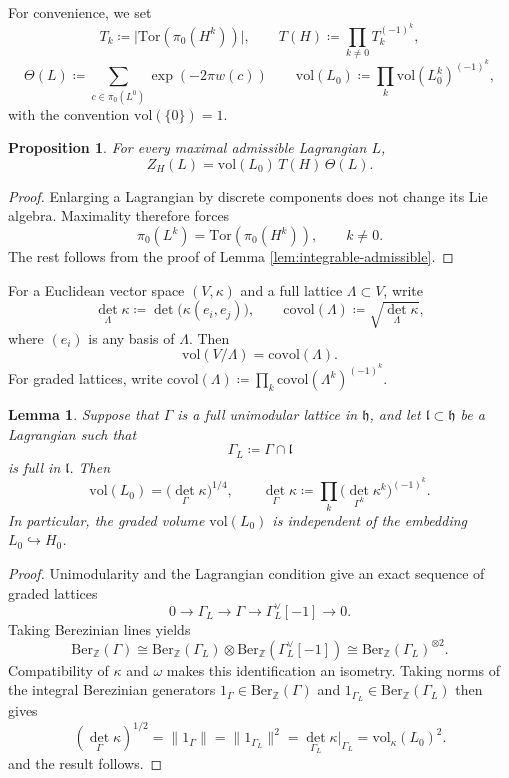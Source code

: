 \documentclass[12pt]{amsart}
\numberwithin{table}{section}
\numberwithin{equation}{section}
\newtheorem{lem}{Lemma}[section]
\newtheorem{prop}{Proposition}[section]
\theoremstyle{plain}
\newcommand{\fh}{\mathfrak{h}}
\newcommand{\fl}{\mathfrak{l}}
\newcommand{\Z}{\mathbb{Z}}
\newcommand{\Tor}{\mathrm{Tor}}
\newcommand{\vol}{\mathrm{vol}}
\newcommand{\covol}{\mathrm{covol}}
\newcommand{\Ber}{\mathrm{Ber}}
\begin{document}
For convenience, we set
\[
T_k\coloneq\bigl|\Tor (\pi_0(H^k))\bigr|,
\qquad
T(H)\coloneq\prod_{k\ne0}T_k^{(-1)^k},
\]
\[
\Theta(L)\coloneq\sum_{c\in\pi_0(L^0)}\exp(-2 \pi w(c))
\qquad
\vol(L_0)\coloneq\prod_k \vol(L_0^k)^{(-1)^k},
\]
with the convention $\vol(\{0\})=1$.

\begin{prop}\label{prop:partition-factorization}
For every maximal admissible Lagrangian $L$,
\begin{equation}\label{eq:partition-factorization}
Z_H(L)=\vol(L_0)\, T(H)\, \Theta(L).
\end{equation}
\end{prop}

\begin{proof}
Enlarging a Lagrangian by discrete components does not change its Lie algebra. Maximality therefore forces
\[
\pi_0(L^k)=
\Tor(\pi_0(H^k)), \qquad k\ne0.
\]
The rest follows from the proof of Lemma \ref{lem:integrable-admissible}.
\end{proof}

For a Euclidean vector space $(V,\kappa)$ and a full lattice $\Lambda\subset V$, write
\[
{\det}_\Lambda \kappa\coloneq\det\bigl(\kappa(e_i,e_j)\bigr),
\qquad
\covol(\Lambda)\coloneq\sqrt{{\det}_\Lambda \kappa},
\]
where $(e_i)$ is any basis of $\Lambda$. Then
\[
\vol(V/\Lambda) = \covol(\Lambda).
\]
For graded lattices, write $\covol(\Lambda)\coloneqq\prod_k\covol(\Lambda^k)^{(-1)^k}$.


\begin{lem}\label{lem:unimodular-volume}
Suppose that $\Gamma$ is a full unimodular lattice in $\fh$, and let $\fl\subset\fh$ be a Lagrangian such that 
\[
\Gamma_L\coloneq\Gamma\cap\fl
\]
is full in $\fl$. Then
\[
\vol(L_0)=\bigl({\det}_\Gamma \kappa \bigr)^{1/4},
\qquad
{\det}_\Gamma \kappa \coloneq\prod_k\bigl({\det}_{\Gamma^k}\kappa^k\bigr)^{(-1)^k}.
\]
In particular, the graded volume $\vol(L_0)$ is independent of the embedding $L_0\hookrightarrow H_0$.
\end{lem}

\begin{proof}
Unimodularity and the Lagrangian condition give an exact sequence of graded lattices
\[
0\longrightarrow\Gamma_L\longrightarrow\Gamma
\longrightarrow\Gamma_L^\vee[-1]\longrightarrow0.
\]
Taking Berezinian lines yields
\[
\Ber_\Z(\Gamma)\cong
\Ber_\Z(\Gamma_L)\otimes\Ber_\Z(\Gamma_L^\vee[-1])
\cong\Ber_\Z(\Gamma_L)^{\otimes2}.
\]
Compatibility of $\kappa$ and $\omega$ makes this identification an isometry. Taking norms of the integral Berezinian generators $1_\Gamma \in \Ber_\Z(\Gamma)$ and $1_{\Gamma_L} \in \Ber_\Z(\Gamma_L)$ then gives
\[
({\det}_{\Gamma}\kappa)^{1/2}
=\lVert 1_{\Gamma}\rVert
=\lVert 1_{\Gamma_L}\rVert^2
={\det}_{\Gamma_L}\kappa|_{\Gamma_L}
=\vol_{\kappa}(L_0)^2.
\]
and the result follows.
\end{proof}
\end{document}
